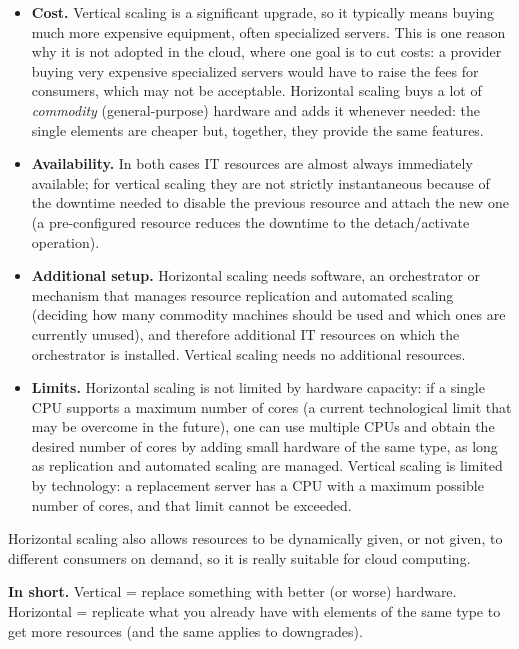 \documentclass[11pt,a4paper,openany]{report}
\begin{document}
 \begin{itemize}
 	\item \textbf{Cost.} Vertical scaling is a significant upgrade, so it typically means buying much more expensive equipment, often specialized servers. This is one reason why it is not adopted in the cloud, where one goal is to cut costs: a provider buying very expensive specialized servers would have to raise the fees for consumers, which may not be acceptable. Horizontal scaling buys a lot of \emph{commodity} (general-purpose) hardware and adds it whenever needed: the single elements are cheaper but, together, they provide the same features.
 	\item \textbf{Availability.} In both cases IT resources are almost always immediately available; for vertical scaling they are not strictly instantaneous because of the downtime needed to disable the previous resource and attach the new one (a pre-configured resource reduces the downtime to the detach/activate operation).
 	\item \textbf{Additional setup.} Horizontal scaling needs software, an orchestrator or mechanism that manages resource replication and automated scaling (deciding how many commodity machines should be used and which ones are currently unused), and therefore additional IT resources on which the orchestrator is installed. Vertical scaling needs no additional resources.
 	\item \textbf{Limits.} Horizontal scaling is not limited by hardware capacity: if a single CPU supports a maximum number of cores (a current technological limit that may be overcome in the future), one can use multiple CPUs and obtain the desired number of cores by adding small hardware of the same type, as long as replication and automated scaling are managed. Vertical scaling is limited by technology: a replacement server has a CPU with a maximum possible number of cores, and that limit cannot be exceeded.
 \end{itemize}
 
 Horizontal scaling also allows resources to be dynamically given, or not given, to different consumers on demand, so it is really suitable for cloud computing.
 
 \begin{notebox}
 	\textbf{In short.} Vertical = replace something with better (or worse) hardware. Horizontal = replicate what you already have with elements of the same type to get more resources (and the same applies to downgrades).
 \end{notebox}
\end{document}
